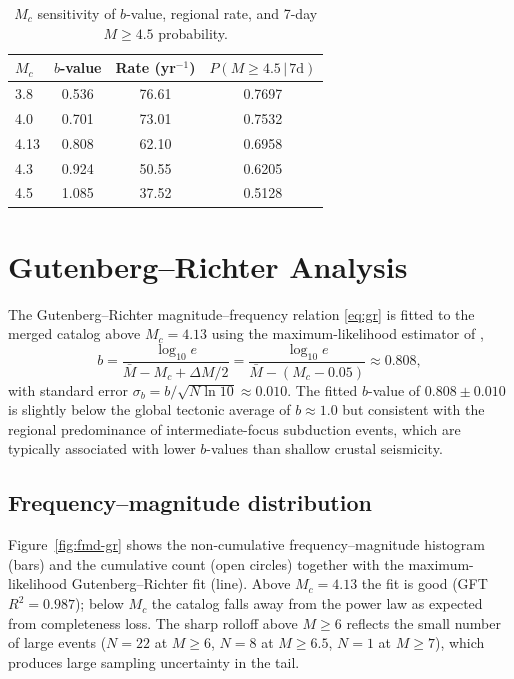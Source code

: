\documentclass[10pt,a4paper,twocolumn]{article}
\begin{document}
\begin{table}[t]
\centering
\caption{$M_c$ sensitivity of $b$-value, regional rate, and 7-day $M\geq4.5$ probability.}\label{tab:mc-sensitivity}
\small
\begin{tabular*}{\columnwidth}{@{\extracolsep{\fill}}lccc}
\toprule
$M_c$ & $b$-value & Rate (yr$^{-1}$) & $P(M\geq4.5\,|\,7\text{d})$ \\
\midrule
3.8 & 0.536 & 76.61 & 0.7697 \\
4.0 & 0.701 & 73.01 & 0.7532 \\
4.13 & 0.808 & 62.10 & 0.6958 \\
4.3 & 0.924 & 50.55 & 0.6205 \\
4.5 & 1.085 & 37.52 & 0.5128 \\
\bottomrule
\end{tabular*}
\end{table}

\section{Gutenberg--Richter Analysis}\label{sec:gr}

The Gutenberg--Richter magnitude--frequency relation \eqref{eq:gr} \cite{gutenberg1944} is fitted to the merged catalog above $M_c=4.13$ using the maximum-likelihood estimator of \cite{aki1965},
\begin{equation}\label{eq:b-mle}
b = \frac{\log_{10} e}{\bar M - M_c + \Delta M / 2} = \frac{\log_{10} e}{\bar M - (M_c - 0.05)} \approx 0.808,
\end{equation}
with standard error $\sigma_b = b / \sqrt{N \ln 10} \approx 0.010$. The fitted $b$-value of $0.808\pm0.010$ is slightly below the global tectonic average of $b\approx1.0$ but consistent with the regional predominance of intermediate-focus subduction events, which are typically associated with lower $b$-values than shallow crustal seismicity.

\subsection{Frequency--magnitude distribution}

Figure~\ref{fig:fmd-gr} shows the non-cumulative frequency--magnitude histogram (bars) and the cumulative count (open circles) together with the maximum-likelihood Gutenberg--Richter fit (line). Above $M_c=4.13$ the fit is good (GFT $R^2=0.987$); below $M_c$ the catalog falls away from the power law as expected from completeness loss. The sharp rolloff above $M\geq6$ reflects the small number of large events ($N=22$ at $M\geq6$, $N=8$ at $M\geq6.5$, $N=1$ at $M\geq7$), which produces large sampling uncertainty in the tail.
\end{document}
